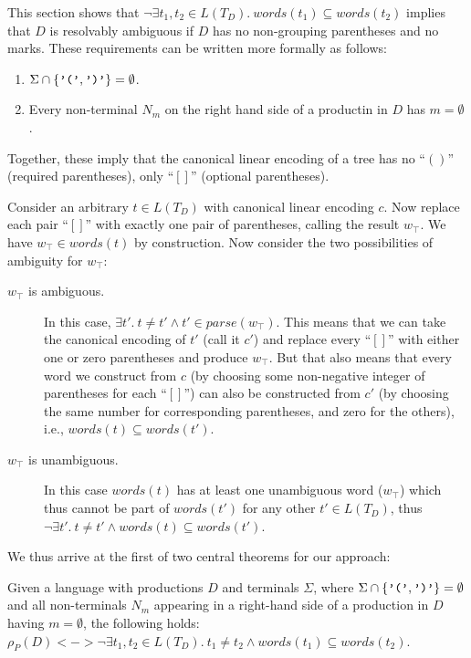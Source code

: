 \documentclass[runningheads]{llncs}
\newcommand{\T}{\Sigma} %
\newcommand{\parse}{\mathit{parse}} %
\newcommand{\words}{\mathit{words}} %
\newcommand{\reqpl}{(}
\newcommand{\reqpr}{)}
\newcommand{\reqp}[1]{\reqpl#1\reqpr}
\newcommand{\pospl}{[}
\newcommand{\pospr}{]}
\newcommand{\posp}[1]{\pospl#1\pospr}
\begin{document}
This section shows that $\neg \exists t_1, t_2 \in L(T_D).\ \words(t_1) \subseteq \words(t_2)$ implies that $D$ is resolvably ambiguous if $D$ has no non-grouping parentheses and no marks. These requirements can be written more formally as follows:

\begin{enumerate}
  \item $\T \cap \{\verb|'('|, \verb|')'|\} = \emptyset$.
  \item Every non-terminal $N_m$ on the right hand side of a productin in $D$ has $m = \emptyset$.
\end{enumerate}

\noindent Together, these imply that the canonical linear encoding of a tree has no ``$\reqp{}$'' (required parentheses), only ``$\posp{}$'' (optional parentheses).

Consider an arbitrary $t \in L(T_D)$ with canonical linear encoding $c$. Now replace each pair ``$\posp{}$'' with exactly one pair of parentheses, calling the result $w_\top$. We have $w_\top \in \words(t)$ by construction. Now consider the two possibilities of ambiguity for $w_\top$:

\begin{description}
  \item[$w_\top$ is ambiguous.] In this case, $\exists t'.\ t \neq t' \land t' \in \parse(w_\top)$. This means that we can take the canonical encoding of $t'$ (call it $c'$) and replace every ``$[]$'' with either one or zero parentheses and produce $w_\top$. But that also means that every word we construct from $c$ (by choosing some non-negative integer of parentheses for each ``$[]$'') can also be constructed from $c'$ (by choosing the same number for corresponding parentheses, and zero for the others), i.e., $\words(t) \subseteq \words(t')$.
  \item[$w_\top$ is unambiguous.] In this case $\words(t)$ has at least one unambiguous word ($w_\top$) which thus cannot be part of $\words(t')$ for any other $t' \in L(T_D)$, thus $\neg \exists t'.\ t \neq t' \land \words(t) \subseteq \words(t')$.
\end{description}

\noindent We thus arrive at the first of two central theorems for our approach:

\begin{theorem}
  Given a language with productions $D$ and terminals $\T$, where $\T \cap \{\verb|'('|, \verb|')'|\} = \emptyset$ and all non-terminals $N_m$ appearing in a right-hand side of a production in $D$ having $m = \emptyset$, the following holds: $\rho_P(D) <-> \neg \exists t_1, t_2 \in L(T_D).\ t_1 \neq t_2 \land \words(t_1) \subseteq \words(t_2)$.
\end{theorem}
\end{document}
